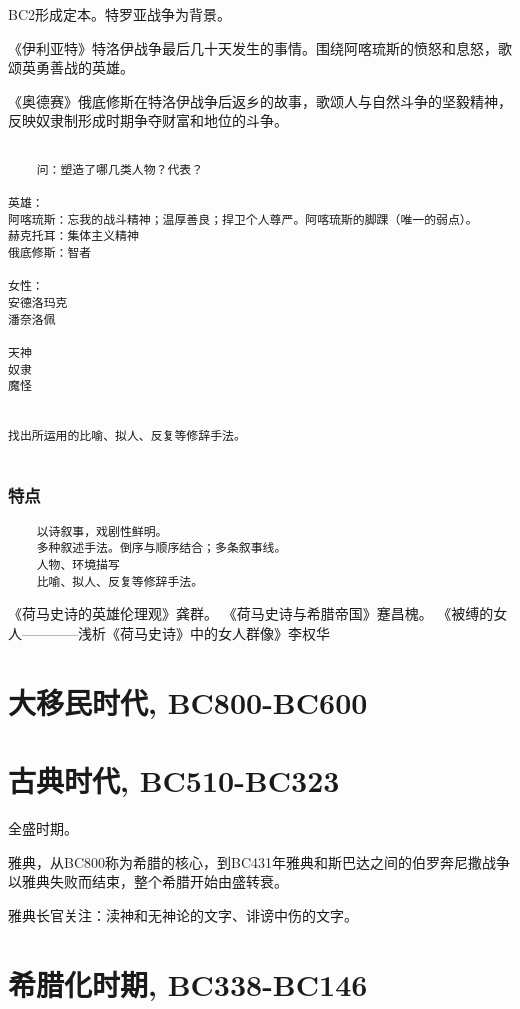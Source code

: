 \documentclass[UTF8]{../RepresentationUniverse}
\begin{document}
BC2形成定本。特罗亚战争为背景。

《伊利亚特》特洛伊战争最后几十天发生的事情。围绕阿喀琉斯的愤怒和息怒，歌颂英勇善战的英雄。

《奥德赛》俄底修斯在特洛伊战争后返乡的故事，歌颂人与自然斗争的坚毅精神，反映奴隶制形成时期争夺财富和地位的斗争。




\begin{lstlisting}

    问：塑造了哪几类人物？代表？

英雄：
阿喀琉斯：忘我的战斗精神；温厚善良；捍卫个人尊严。阿喀琉斯的脚踝（唯一的弱点）。
赫克托耳：集体主义精神
俄底修斯：智者

女性：
安德洛玛克
潘奈洛佩

天神
奴隶
魔怪


找出所运用的比喻、拟人、反复等修辞手法。
    
\end{lstlisting}


\subsubsection{特点}
\begin{lstlisting}
    以诗叙事，戏剧性鲜明。
    多种叙述手法。倒序与顺序结合；多条叙事线。
    人物、环境描写
    比喻、拟人、反复等修辞手法。
\end{lstlisting}






《荷马史诗的英雄伦理观》龚群。
《荷马史诗与希腊帝国》蹇昌槐。
《被缚的女人————浅析《荷马史诗》中的女人群像》李权华


\section{大移民时代, BC800-BC600}

\section{古典时代, BC510-BC323}
全盛时期。

雅典，从BC800称为希腊的核心，到BC431年雅典和斯巴达之间的伯罗奔尼撒战争以雅典失败而结束，整个希腊开始由盛转衰。

雅典长官关注：渎神和无神论的文字、诽谤中伤的文字。

\section{希腊化时期, BC338-BC146}
\end{document}
